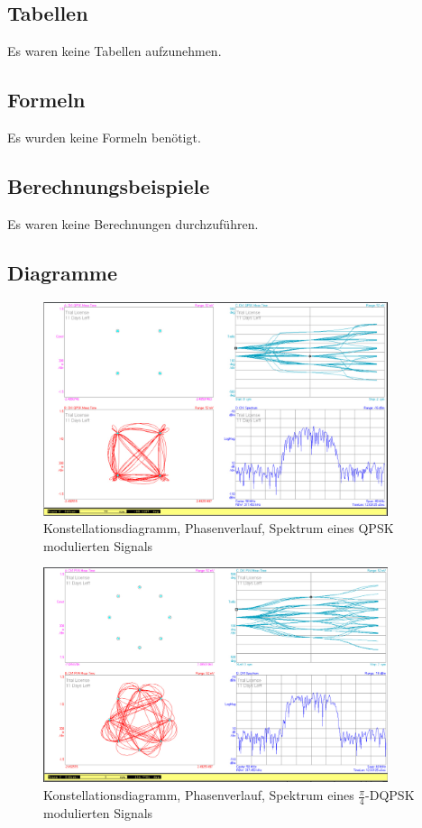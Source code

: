 \documentclass[12pt,a4paper,ngerman]{article}
\begin{document}
\subsection{Tabellen}
Es waren keine Tabellen aufzunehmen. 
\subsection{Formeln}
Es wurden keine Formeln benötigt.
\subsection{Berechnungsbeispiele}
Es waren keine Berechnungen durchzuführen.

\pagebreak
\subsection{Diagramme}
\begin{figure}[H]
\centering
\includegraphics[width=0.9\textwidth]{figures/Aufgabe3_QPSK.jpg} 
\caption{Konstellationsdiagramm, Phasenverlauf, Spektrum eines QPSK modulierten Signals}
\label{fig:3_QPSK}
\end{figure}

\begin{figure}[H]
\centering
\includegraphics[width=0.9\textwidth]{figures/Aufgabe3_pi4DQPSK.jpg} 
\caption{Konstellationsdiagramm, Phasenverlauf, Spektrum eines $\frac{\pi}{4}$-DQPSK modulierten Signals}
\label{fig:3_PI4DQPSK}
\end{figure}
\end{document}
